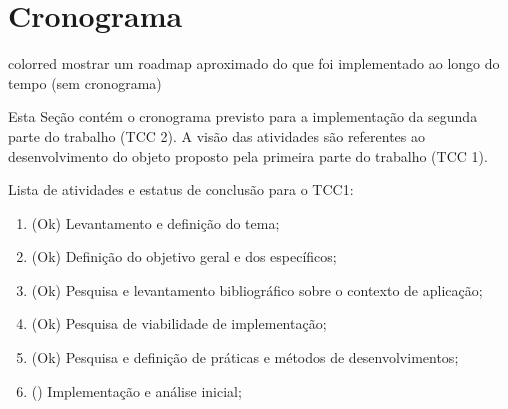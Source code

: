\section{Cronograma}
\label{sec:cron}

{color{red} mostrar um roadmap aproximado do que foi implementado ao longo do tempo (sem cronograma)}

Esta Seção contém o cronograma previsto para a implementação da segunda
parte do trabalho (TCC 2). A visão das atividades são referentes ao
desenvolvimento do objeto proposto pela primeira parte do trabalho (TCC 1).

Lista de atividades e estatus de conclusão para o TCC1:
\begin{enumerate}
  \item (Ok) Levantamento e definição do tema;
  \item (Ok) Definição do objetivo geral e dos específicos;
  \item (Ok) Pesquisa e levantamento bibliográfico sobre o contexto de aplicação;
  \item (Ok) Pesquisa de viabilidade de implementação;
  \item (Ok) Pesquisa e definição de práticas e métodos de desenvolvimentos;
  \item (\hspace{17pt}) Implementação e análise inicial;
\end{enumerate}

